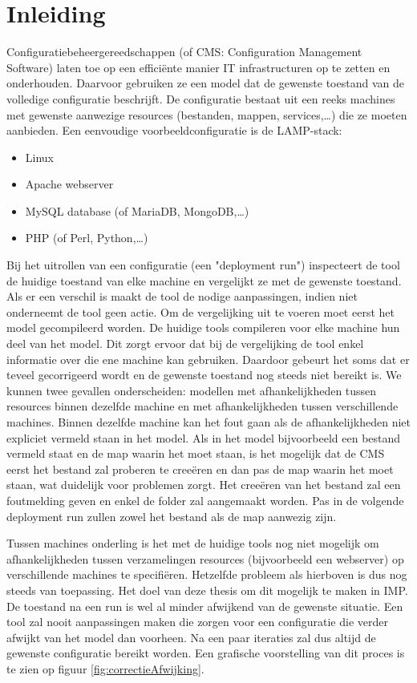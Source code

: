 \chapter{Inleiding}
\label{inleiding}
Configuratiebeheergereedschappen (of CMS: Configuration Management Software) laten toe op een effici\"ente manier IT infrastructuren op te zetten en onderhouden.
Daarvoor gebruiken ze een model dat de gewenste toestand van de volledige configuratie beschrijft.
De configuratie bestaat uit een reeks machines met gewenste aanwezige resources (bestanden, mappen, services,\ldots) die ze moeten aanbieden.
Een eenvoudige voorbeeldconfiguratie is de LAMP-stack: 
\begin{itemize}
  \item Linux
  \item Apache webserver
  \item MySQL database (of MariaDB, MongoDB,\ldots)
  \item PHP (of Perl, Python,\ldots)
\end{itemize}

Bij het uitrollen van een configuratie (een "deployment run") inspecteert de tool de huidige toestand van elke machine en vergelijkt ze met de gewenste toestand.
Als er een verschil is maakt de tool de nodige aanpassingen, indien niet onderneemt de tool geen actie.
Om de vergelijking uit te voeren moet eerst het model gecompileerd worden.
De huidige tools compileren voor elke machine hun deel van het model.
Dit zorgt ervoor dat bij de vergelijking de tool enkel informatie over die ene machine kan gebruiken.
Daardoor gebeurt het soms dat er teveel gecorrigeerd wordt en de gewenste toestand nog steeds niet bereikt is.
We kunnen twee gevallen onderscheiden: modellen met afhankelijkheden tussen resources binnen dezelfde machine en met afhankelijkheden tussen verschillende machines.
Binnen dezelfde machine kan het fout gaan als de afhankelijkheden niet expliciet vermeld staan in het model. 
Als in het model bijvoorbeeld een bestand vermeld staat en de map waarin het moet staan, is het mogelijk dat de CMS eerst het bestand zal proberen te cree\"eren en dan pas de map waarin het moet staan, wat duidelijk voor problemen zorgt.
Het cree\"eren van het bestand zal een foutmelding geven en enkel de folder zal aangemaakt worden.
Pas in de volgende deployment run zullen zowel het bestand als de map aanwezig zijn.

Tussen machines onderling is het met de huidige tools nog niet mogelijk om afhankelijkheden tussen verzamelingen resources (bijvoorbeeld een webserver) op verschillende machines te specifi\"eren. 
Hetzelfde probleem als hierboven is dus nog steeds van toepassing. 
Het doel van deze thesis om dit mogelijk te maken in IMP.
De toestand na een run is wel al minder afwijkend van de gewenste situatie.
Een tool zal nooit aanpassingen maken die zorgen voor een configuratie die verder afwijkt van het model dan voorheen.
Na een paar iteraties zal dus altijd de gewenste configuratie bereikt worden.
Een grafische voorstelling van dit proces is te zien op figuur \ref{fig:correctieAfwijking}.


